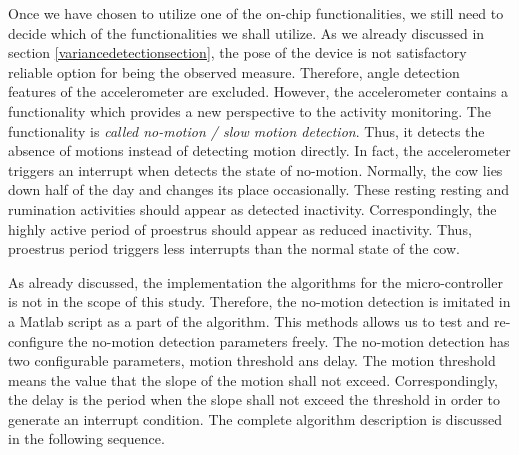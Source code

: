 \documentclass[english,12pt,a4paper,pdftex,elec,utf8]{aaltothesis}
\begin{document}
Once we have chosen to utilize one of the on-chip functionalities, we still need to decide which of the functionalities we shall utilize. As we already discussed in section \ref{variancedetectionsection}, the pose of the device is not satisfactory reliable option for being the observed measure. Therefore, angle detection features of the accelerometer are excluded. However, the accelerometer contains a functionality which provides a new perspective to the activity monitoring. The functionality is \textit{called no-motion / slow motion detection}. Thus, it detects the absence of motions instead of detecting motion directly. In fact, the accelerometer triggers an interrupt when detects the state of no-motion. Normally, the cow lies down half of the day and changes its place occasionally. These resting resting and rumination activities should appear as detected inactivity. Correspondingly, the highly active period of proestrus should appear as reduced inactivity.  Thus, proestrus period triggers less interrupts than the normal state of the cow.

As already discussed, the implementation the algorithms for the micro-controller is not in the scope of this study. Therefore, the no-motion detection is imitated in a Matlab script as a part of the algorithm. This methods allows us to test and re-configure the no-motion detection parameters freely. The no-motion detection has two configurable parameters, motion threshold ans delay. The motion threshold means the value that the slope of the motion shall not exceed. Correspondingly, the delay is the period when the slope shall not exceed the threshold in order to generate an interrupt condition. The complete algorithm description is discussed in the following sequence.
\end{document}
